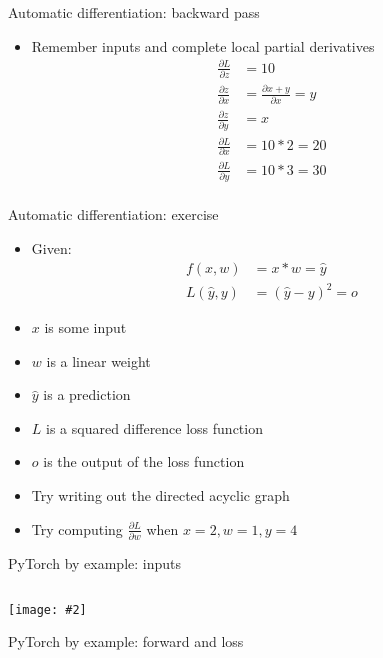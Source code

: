 \documentclass[hyperref={pdfpagelabels=false},12pt]{beamer}
\newcommand{\ig}[2]{\texttt{[image: \#2]}}
\newcommand{\pygment}[3]{\inputminted[bgcolor=lightgray,linenos,fontsize=#1]{#2}{#3}}
\begin{document}
\begin{frame}{Automatic differentiation: backward pass}
  \begin{itemize}
    \item Remember inputs and complete local partial derivatives
      \begin{align*}
        \frac{\partial L}{\partial z} &= 10 \\
        \frac{\partial z}{\partial x} &= \frac{\partial x + y}{\partial x} = y \\
        \frac{\partial z}{\partial y} &= x \\
        \frac{\partial L}{\partial x} &= 10 * 2 = 20 \\
        \frac{\partial L}{\partial y} &= 10 * 3 = 30 \\
      \end{align*}
  \end{itemize}
\end{frame}

\begin{frame}{Automatic differentiation: exercise}
  \begin{itemize}
      \item Given:
        \begin{align*}
          f(x, w) &= x * w = \hat{y} \\
          L(\hat{y}, y) &= (\hat{y} - y)^2 = o
        \end{align*}
      \item $x$ is some input
      \item $w$ is a linear weight
      \item $\hat{y}$ is a prediction
      \item $L$ is a squared difference loss function
      \item $o$ is the output of the loss function
      \item Try writing out the directed acyclic graph
      \item Try computing $\frac{\partial L}{\partial w}$ when $x=2, w=1, y=4$
  \end{itemize}
\end{frame}

\begin{frame}{PyTorch by example: inputs}
  \centering
  \pygment{\scriptsize}{python}{code/basic-training.0.py}
  \ig{0.5}{figures/2x.png}
\end{frame}

\begin{frame}{PyTorch by example: forward and loss}
  \pygment{\scriptsize}{python}{code/basic-training.1.py}
\end{frame}
\end{document}
